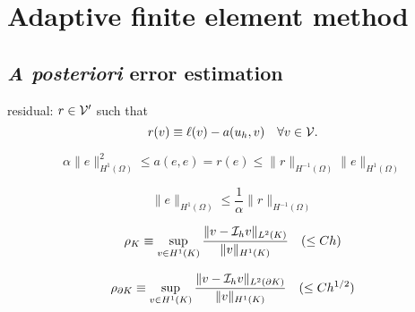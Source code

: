 \chapter{Adaptive finite element method}

\section{\textit{A posteriori} error estimation}

residual: $r \in \mathcal{V}'$ such that
\begin{equation*}
  r(v) \equiv \ell(v) - a(u_h,v) \quad \forall v \in \mathcal{V}.
\end{equation*}

\begin{equation*}
  \alpha \| e \|_{H^1(\Omega)}^2 \leq a(e,e) = r(e) \leq \| r \|_{H^{-1}(\Omega)} \| e \|_{H^1(\Omega)}
\end{equation*}

\begin{equation*}
  \| e \|_{H^1(\Omega)} \leq \frac{1}{\alpha} \| r \|_{H^{-1}(\Omega)}
\end{equation*}


\begin{equation*}
  \rho_K \equiv \sup_{v \in H^1(K)} \frac{\| v - \mathcal{I}_h v \|_{L^2(K)}}{\| v \|_{H^1(K)}} \quad (\leq C h)
\end{equation*}

\begin{equation*}
  \rho_{\partial K} \equiv \sup_{v \in H^1(K)} \frac{\| v - \mathcal{I}_h v \|_{L^2(\partial K)}}{ \| v \|_{H^1(K)}} \quad ( \leq C h^{1/2})
\end{equation*}



